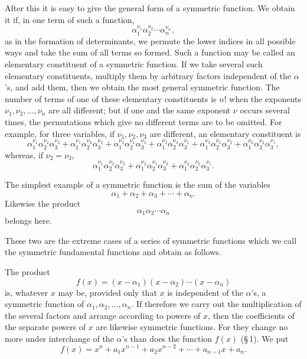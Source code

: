 \documentclass[11pt]{article}
\begin{document}
After this it is easy to give the general form of a symmetric function. We obtain it if, in one term of such a function,
\[
 \alpha_1^{\nu_1}\alpha_2^{\nu_2}\cdots\alpha_n^{\nu_n},
\]
as in the formation of determinants, we permute the lower indices in all possible ways and take the sum of all terms so formed. Such a function may be called an elementary constituent of a symmetric function. If we take several such elementary constituents, multiply them by arbitrary factors independent of the $\alpha$'s, and add them, then we obtain the most general symmetric function. The number of terms of one of these elementary constituents is $n!$ when the exponents $\nu_1,\nu_2,\ldots,\nu_n$ are all different; but if one and the same exponent $\nu$ occurs several times, the permutations which give no different terms are to be omitted. For example, for three variables, if $\nu_1,\nu_2,\nu_3$ are different, an elementary constituent is
\[
 \alpha_1^{\nu_1}\alpha_2^{\nu_2}\alpha_3^{\nu_3}
+\alpha_1^{\nu_1}\alpha_2^{\nu_3}\alpha_3^{\nu_2}
+\alpha_1^{\nu_2}\alpha_2^{\nu_1}\alpha_3^{\nu_3}
+\alpha_1^{\nu_2}\alpha_2^{\nu_3}\alpha_3^{\nu_1}
+\alpha_1^{\nu_3}\alpha_2^{\nu_1}\alpha_3^{\nu_2}
+\alpha_1^{\nu_3}\alpha_2^{\nu_2}\alpha_3^{\nu_1},
\]
whereas, if $\nu_2=\nu_3$,
\[
 \alpha_1^{\nu_1}\alpha_2^{\nu_2}\alpha_3^{\nu_2}
+\alpha_1^{\nu_2}\alpha_2^{\nu_1}\alpha_3^{\nu_2}
+\alpha_1^{\nu_2}\alpha_2^{\nu_2}\alpha_3^{\nu_1}.
\]

The simplest example of a symmetric function is the sum of the variables
\[
 \alpha_1+\alpha_2+\alpha_3+\cdots+\alpha_n.
\]
Likewise the product
\[
 \alpha_1\alpha_2\cdots\alpha_n
\]
belongs here.

These two are the extreme cases of a series of symmetric functions which we call the symmetric fundamental functions and obtain as follows.

The product
\begin{equation}
 f(x)=(x-\alpha_1)(x-\alpha_2)\cdots(x-\alpha_n)
\tag{1}
\end{equation}
is, whatever $x$ may be, provided only that $x$ is independent of the $\alpha$'s, a symmetric function of $\alpha_1,\alpha_2,\ldots,\alpha_n$. If therefore we carry out the multiplication of the several factors and arrange according to powers of $x$, then the coefficients of the separate powers of $x$ are likewise symmetric functions. For they change no more under interchange of the $\alpha$'s than does the function $f(x)$ (\S\,1). We put
\begin{equation}
 f(x)=x^n+a_1x^{n-1}+a_2x^{n-2}+\cdots+a_{n-1}x+a_n.
\tag{2}
\end{equation}
\end{document}
